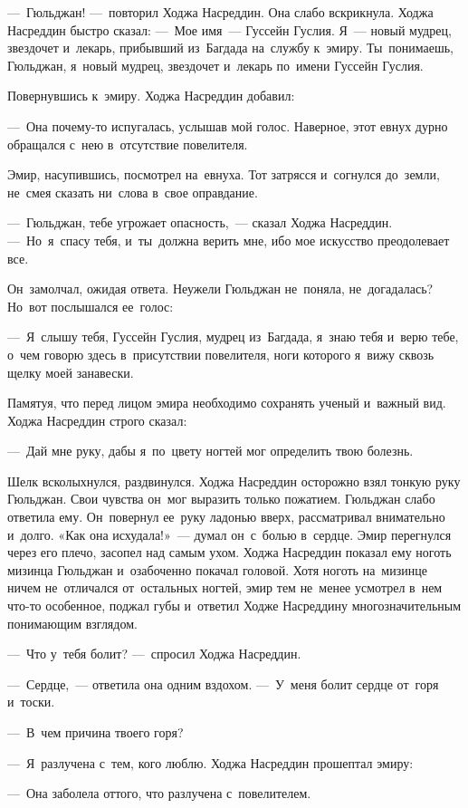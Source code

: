 \documentclass[12pt,a4paper]{book}
\begin{document}
—~Гюльджан! —~повторил Ходжа Насреддин. Она слабо вскрикнула. Ходжа Насреддин быстро сказал: —~Мое имя~— Гуссейн Гуслия. Я~— новый мудрец, звездочет и~лекарь, прибывший из~Багдада на~службу к~эмиру. Ты~понимаешь, Гюльджан, я~новый мудрец, звездочет и~лекарь по~имени Гуссейн Гуслия.

Повернувшись к~эмиру. Ходжа Насреддин добавил:

—~Она почему-то испугалась, услышав мой голос. Наверное, этот евнух дурно обращался с~нею в~отсутствие повелителя.

Эмир, насупившись, посмотрел на~евнуха. Тот затрясся и~согнулся до~земли, не~смея сказать ни~слова в~свое оправдание.

—~Гюльджан, тебе угрожает опасность,~— сказал Ходжа Насреддин. —~Но~я~спасу тебя, и~ты~должна верить мне, ибо мое искусство преодолевает все.

Он~замолчал, ожидая ответа. Неужели Гюльджан не~поняла, не~догадалась? Но~вот послышался ее~голос:

—~Я~слышу тебя, Гуссейн Гуслия, мудрец из~Багдада, я~знаю тебя и~верю тебе, о~чем говорю здесь в~присутствии повелителя, ноги которого я~вижу сквозь щелку моей занавески.

Памятуя, что перед лицом эмира необходимо сохранять ученый и~важный вид. Ходжа Насреддин строго сказал:

—~Дай мне руку, дабы я~по~цвету ногтей мог определить твою болезнь.

Шелк всколыхнулся, раздвинулся. Ходжа Насреддин осторожно взял тонкую руку Гюльджан. Свои чувства он~мог выразить только пожатием. Гюльджан слабо ответила ему. Он~повернул ее~руку ладонью вверх, рассматривал внимательно и~долго. «Как она исхудала!»~— думал он~с~болью в~сердце. Эмир перегнулся через его плечо, засопел над самым ухом. Ходжа Насреддин показал ему ноготь мизинца Гюльджан и~озабоченно покачал головой. Хотя ноготь на~мизинце ничем не~отличался от~остальных ногтей, эмир тем не~менее усмотрел в~нем что-то особенное, поджал губы и~ответил Ходже Насреддину многозначительным понимающим взглядом.

—~Что у~тебя болит? —~спросил Ходжа Насреддин.

—~Сердце,~— ответила она одним вздохом. —~У~меня болит сердце от~горя и~тоски.

—~В~чем причина твоего горя?

—~Я~разлучена с~тем, кого люблю. Ходжа Насреддин прошептал эмиру:

—~Она заболела оттого, что разлучена с~повелителем.
\end{document}
